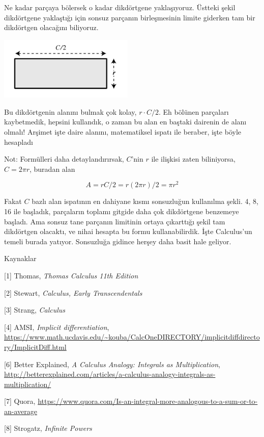 \documentclass[12pt,fleqn]{article}\usepackage{../../common}
\begin{document}
Ne kadar parçaya bölersek o kadar dikdörtgene yaklaşıyoruz. Üstteki şekil
dikdörtgene yaklaştığı için sonsuz parçanın birleşmesinin limite giderken
tam bir dikdörtgen olacağını biliyoruz. 

\includegraphics[height=3cm]{circ_7.png}

Bu dikdörtgenin alanını bulmak çok kolay, $r \cdot C/2$. Eh bölünen parçaları
kaybetmedik, hepsini kullandık, o zaman bu alan en baştaki dairenin de alanı
olmalı! Arşimet işte daire alanını, matematiksel ispatı ile beraber, işte böyle
hesapladı

Not: Formülleri daha detaylandırırsak, $C$'nin $r$ ile ilişkisi zaten
biliniyorsa, $C = 2 \pi r$, buradan alan

$$
A = r C/2 = r (2 \pi r)/2 = \pi r^2 
$$

Fakat $C$ bazlı alan ispatının en dahiyane kısmı sonsuzluğun kullanılma
şekli. 4, 8, 16 ile başladık, parçaların toplamı gitgide daha çok dikdörtgene
benzemeye başladı. Ama sonsuz tane parçanın limitinin ortaya çıkarttığı şekil
tam dikdörtgen olacaktı, ve nihai hesapta bu formu kullanabilirdik. İşte
Calculus'un temeli burada yatıyor. Sonsuzluğa gidince herşey daha basit hale
geliyor.

Kaynaklar

[1] Thomas, {\em Thomas Calculus 11th Edition}

[2] Stewart, {\em Calculus, Early Transcendentals}

[3] Strang, {\em Calculus}

[4] AMSI, {\em Implicit differentiation},
    \url{https://www.math.ucdavis.edu/~kouba/CalcOneDIRECTORY/implicitdiffdirectory/ImplicitDiff.html}

[6] Better Explained, {\em A Calculus Analogy: Integrals as  Multiplication},
    \url{http://betterexplained.com/articles/a-calculus-analogy-integrals-as-multiplication/}

[7] Quora, \url{https://www.quora.com/Is-an-integral-more-analogous-to-a-sum-or-to-an-average}

[8] Strogatz, {\em Infinite Powers}
\end{document}
